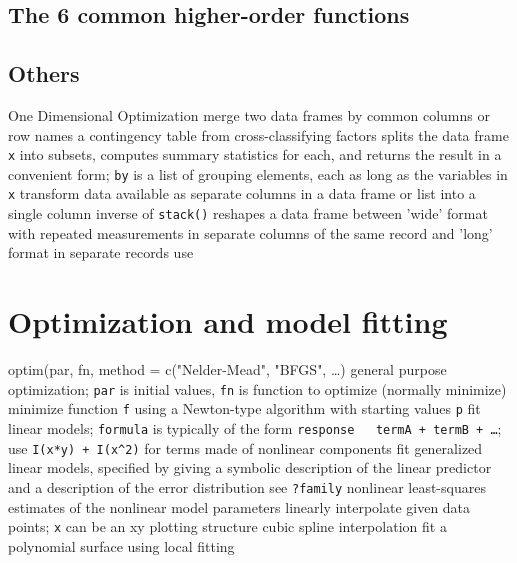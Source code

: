 \subsection{The 6 common higher-order functions}{}

\subsection{Others}{}
	{One Dimensional Optimization}
	{merge two data frames by com\-mon col\-umns or row names}
	{a contingency table from cross-classi\-fy\-ing factors}
	{splits the data frame {\tt x} into subsets, computes summary statistics for each, and returns the result in a convenient form; {\tt by} is a list of grouping elements, each as long as the variables in {\tt x}}
	{transform data available as se\-pa\-rate col\-umns in a data frame or list into a single column}
	{inverse of {\tt stack()}}
	{reshapes a data frame between 'wide' format
    with re\-pea\-ted mea\-sure\-ments in separate
    columns of the same record and 'long' format in separate records}
	{use}

\section{Optimization and model fitting}{{\smalltt optim(par, fn, method = c("Nelder-Mead", "BFGS", \ldots)} general purpose optimization; {\tt par} is initial values, {\tt fn} is function to optimize (normally minimize)}
	{minimize function {\tt f} using a Newton-type algorithm with starting values {\tt p}}
	{fit linear models; {\tt formula} is typically of the form {\tt response ~ termA + termB + \ldots}; use {\tt I(x*y) + I(x\^{}2)} for terms made of nonlinear components}
	{fit generalized linear models, specified by giving a symbolic description of the linear predictor and a description of the error distribution}
	{see {\tt ?family}}
	{nonlinear least-squares estimates of the nonlinear model parameters}
	{linearly interpolate given data points; {\tt x} can be an xy plotting structure}
	{cubic spline interpolation}
	{fit a polynomial surface using local fitting}


